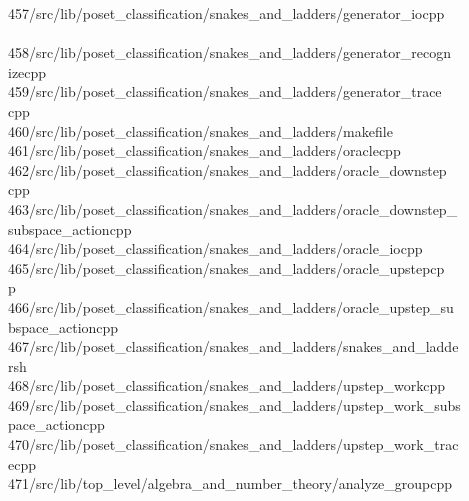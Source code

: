 \begin{tabbing}
457\>/src/lib/poset\_classification/snakes\_and\_ladders/generator\_iocpp\\[0pt]
\>\\[0pt]
458\>/src/lib/poset\_classification/snakes\_and\_ladders/generator\_recogn\\[0pt]
\>izecpp\\[0pt]
459\>/src/lib/poset\_classification/snakes\_and\_ladders/generator\_trace\\[0pt]
\>cpp\\[0pt]
460\>/src/lib/poset\_classification/snakes\_and\_ladders/makefile\\[0pt]
461\>/src/lib/poset\_classification/snakes\_and\_ladders/oraclecpp\\[0pt]
462\>/src/lib/poset\_classification/snakes\_and\_ladders/oracle\_downstep\\[0pt]
\>cpp\\[0pt]
463\>/src/lib/poset\_classification/snakes\_and\_ladders/oracle\_downstep\_\\[0pt]
\>subspace\_actioncpp\\[0pt]
464\>/src/lib/poset\_classification/snakes\_and\_ladders/oracle\_iocpp\\[0pt]
465\>/src/lib/poset\_classification/snakes\_and\_ladders/oracle\_upstepcp\\[0pt]
\>p\\[0pt]
466\>/src/lib/poset\_classification/snakes\_and\_ladders/oracle\_upstep\_su\\[0pt]
\>bspace\_actioncpp\\[0pt]
467\>/src/lib/poset\_classification/snakes\_and\_ladders/snakes\_and\_ladde\\[0pt]
\>rsh\\[0pt]
468\>/src/lib/poset\_classification/snakes\_and\_ladders/upstep\_workcpp\\[0pt]
469\>/src/lib/poset\_classification/snakes\_and\_ladders/upstep\_work\_subs\\[0pt]
\>pace\_actioncpp\\[0pt]
470\>/src/lib/poset\_classification/snakes\_and\_ladders/upstep\_work\_trac\\[0pt]
\>ecpp\\[0pt]
471\>/src/lib/top\_level/algebra\_and\_number\_theory/analyze\_groupcpp\\[0pt]

\end{tabbing}
